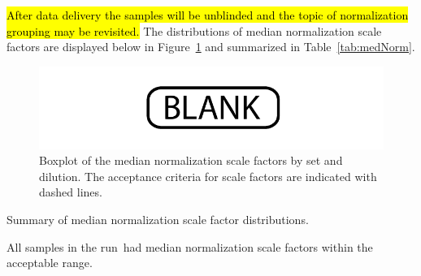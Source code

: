 \documentclass[11pt]{article}
\newif\ifuseLogScale  %
\newif\ifMedFails      %
\newcommand{\Plural}{}
\newcommand{\NumMedFail}{\hl{X}}
\begin{document}

\hl{After data delivery the samples will be unblinded and the topic of
  normalization grouping may be revisited.} The distributions of median
  normalization scale factors are displayed below in Figure~\ref{fig:medNorm} and
  summarized in Table~\ref{tab:medNorm}.



\begin{figure}[H]
  \centering
  \includegraphics[height=.5\textwidth]{plots/med-norm.pdf}
  \caption{Boxplot of the median normalization scale factors by set and
    dilution. The acceptance criteria for scale factors are indicated with dashed
    lines.}
  \label{fig:medNorm}
\end{figure}


\begin{table}[ht!]
  \begin{center}
    
    \ifuseLogScale
      \caption{Summary of log$_2$ median normalization scale factor distributions.}
    \else 
      \caption{Summary of median normalization scale factor distributions.}
    \fi
    \label{tab:medNorm}
  \end{center}
\end{table}

\ifMedFails
There \NumMedFail~that had median normalization scale factors outside the
acceptable range (Table \ref{tab:medFail}). \hl{One of these samples was well
outside the acceptance criteria for all three dilutions and therefore data for
this sample has not been delivered.} Results based on samples with median
normalization scale factors outside the acceptance criteria should be treated
with caution. Sensitivity analysis is recommended.
\else
All samples in the run\Plural~had median normalization scale factors within the
acceptable range.
\fi
\end{document}
